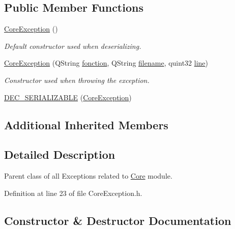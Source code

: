 \subsection*{Public Member Functions}
\begin{DoxyCompactItemize}
\item 
\hyperlink{class_gost_crypt_1_1_core_1_1_core_exception_ad5513666aa795d52050e7b47c0a4a10a}{Core\+Exception} ()
\begin{DoxyCompactList}\small\item\em Default constructor used when deserializing. \end{DoxyCompactList}\item 
\hyperlink{class_gost_crypt_1_1_core_1_1_core_exception_abd9614a03b61603031042ef25d52c30e}{Core\+Exception} (Q\+String \hyperlink{class_gost_crypt_1_1_gost_crypt_exception_a29b8c93d5efbb1ff369107385725a939}{fonction}, Q\+String \hyperlink{class_gost_crypt_1_1_gost_crypt_exception_a749a12375f4ba9d502623b99d8252f38}{filename}, quint32 \hyperlink{class_gost_crypt_1_1_gost_crypt_exception_abf506d911f12a4e969eea500f90bd32c}{line})
\begin{DoxyCompactList}\small\item\em Constructor used when throwing the exception. \end{DoxyCompactList}\item 
\hyperlink{class_gost_crypt_1_1_core_1_1_core_exception_ae03bef21e61c2c09c24a6d75c2b861d0}{D\+E\+C\+\_\+\+S\+E\+R\+I\+A\+L\+I\+Z\+A\+B\+LE} (\hyperlink{class_gost_crypt_1_1_core_1_1_core_exception}{Core\+Exception})
\end{DoxyCompactItemize}
\subsection*{Additional Inherited Members}


\subsection{Detailed Description}
Parent class of all Exceptions related to \hyperlink{namespace_gost_crypt_1_1_core}{Core} module. 

Definition at line 23 of file Core\+Exception.\+h.



\subsection{Constructor \& Destructor Documentation}
\mbox{\label{class_gost_crypt_1_1_core_1_1_core_exception_ad5513666aa795d52050e7b47c0a4a10a}} 
